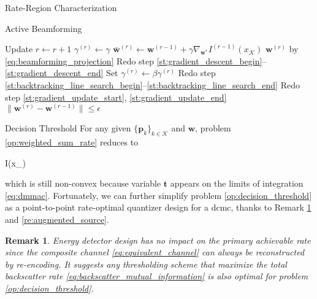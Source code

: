 \documentclass[journal]{IEEEtran}
\newtheorem{remark}{Remark}
\begin{document}
\begin{section}{Rate-Region Characterization}
\begin{subsection}{Active Beamforming}
\begin{algorithm}[!t]
\begin{algorithmic}[1]
				\Repeat
					\State Update $r \gets r+1$
					\State \phantom{Update} $\gamma^{(r)}\gets\gamma$
					\State \phantom{Update} $\bar{\boldsymbol{w}}^{(r)} \gets \boldsymbol{w}^{(r-1)}+\gamma\nabla_{\boldsymbol{w}^*} I^{(r-1)}(x_{\mathcal{K}})$ \label{st:backtracking_line_search_begin}
					\State \phantom{Update} $\boldsymbol{w}^{(r)}$ by \eqref{eq:beamforming_projection}
					\State Redo step \ref{st:gradient_descent_begin}--\ref{st:gradient_descent_end} \label{st:backtracking_line_search_end}
						\State Set $\gamma^{(r)}\gets\beta\gamma^{(r)}$
						\State Redo step \ref{st:backtracking_line_search_begin}--\ref{st:backtracking_line_search_end}
					\EndWhile
					\State Redo step \ref{st:gradient_update_start}, \ref{st:gradient_update_end}
				\Until $\lVert\boldsymbol{w}^{(r)}-\boldsymbol{w}^{(r-1)}\rVert \le \epsilon$
			\end{algorithmic}
		\end{algorithm}
	\end{subsection}

	\begin{subsection}{Decision Threshold}
		For any given $\{\boldsymbol{p}_k\}_{k \in \mathcal{K}}$ and $\boldsymbol{w}$, problem \eqref{op:weighted_sum_rate} reduces to
		\begin{maxi!}
			{}{I(x_{})}{\label{op:decision_threshold}}{\label{ob:decision_threshold}}
			\addConstraint{\eqref{co:sequential_threshold},\eqref{co:nonnegative_threshold},}
		\end{maxi!}
		which is still non-convex because variable $\boldsymbol{t}$ appears on the limits of integration \eqref{eq:dmmac}.
		Fortunately, we can further simplify problem \eqref{op:decision_threshold} as a point-to-point rate-optimal quantizer design for a \gls{dcmc}, thanks to Remark \ref{re:backscatter_decision} and \ref{re:augmented_source}.

		\begin{remark}
			Energy detector design has no impact on the primary achievable rate since the composite channel \eqref{eq:equivalent_channel} can always be reconstructed by re-encoding.
			It suggests any thresholding scheme that maximize the total backscatter rate \eqref{eq:backscatter_mutual_information} is also optimal for problem \eqref{op:decision_threshold}.
			\label{re:backscatter_decision}
		\end{remark}


\end{subsection}
\end{section}
\end{document}
